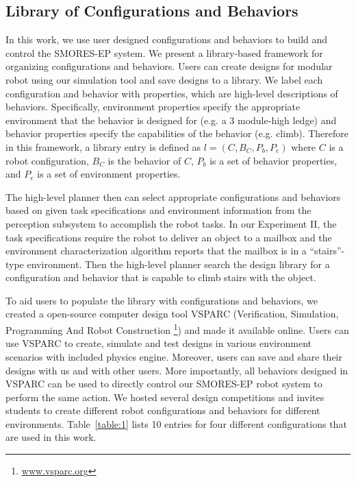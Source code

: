 \documentclass[12pt]{article}
\begin{document}
%



\subsection{Library of Configurations and Behaviors}
\label{sec:configuration-specifics}

In this work, we use user designed configurations and behaviors to build and control the SMORES-EP system.
We present a library-based framework for organizing configurations and behaviors.
Users can create designs for modular robot using our simulation tool and save designs to a library.
We label each configuration and behavior with properties, which are high-level descriptions of behaviors.
Specifically, environment properties specify the appropriate environment that the behavior is designed for (e.g. a 3 module-high ledge) and behavior properties specify the capabilities of the behavior (e.g. climb). 
Therefore in this framework, a library entry is defined as $l = (C,B_C,P_b,P_e)$ where $C$ is a robot configuration, $B_C$ is the behavior of $C$, $P_b$ is a set of behavior properties, and $P_e$ is a set of environment properties.

The high-level planner then can select appropriate configurations and behaviors based on given task specifications and environment information from the perception subsystem to accomplish the robot tasks.
In our Experiment II, the task specifications require the robot to deliver an object to a mailbox and the environment characterization algorithm reports that the mailbox is in a ``stairs''-type environment.
Then the high-level planner search the design library for a configuration and behavior that is capable to climb stairs with the object.

To aid users to populate the library with configurations and behaviors, we created a open-source computer design tool VSPARC (Verification, Simulation, Programming And Robot Construction \footnote{\url{www.vsparc.org}}) and made it available online.
Users can use VSPARC to create, simulate and test designs in various environment scenarios with included physics engine.
Moreover, users can save and share their designs with us and with other users.
More importantly, all behaviors designed in VSPARC can be used to directly control our SMORES-EP robot system to perform the same action.
We hosted several design competitions and invites students to create different robot configurations and behaviors for different environments.
Table~\ref{table:1} lists 10 entries for four different configurations that are used in this work.
\end{document}
